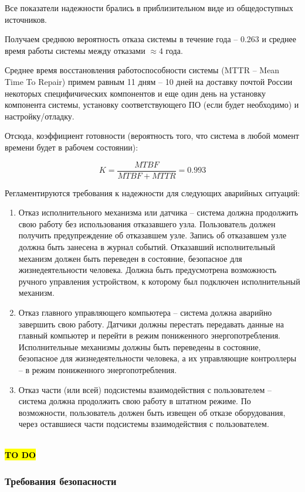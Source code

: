 \documentclass[a4paper, 12pt, titlepage]{article}
\begin{document}
Все показатели надежности брались в приблизительном виде из общедоступных источников.

Получаем среднюю вероятность отказа системы в течение года -- 0.263 и среднее время работы системы между 
отказами $\approx 4$ года.

Среднее время восстановления работоспособности системы (MTTR -- Mean Time To Repair) примем равным 11 дням -- 10 дней 
на доставку почтой России некоторых специфичических компонентов и еще один день на установку компонента системы, установку 
соответствующего ПО (если будет необходимо) и настройку/отладку.

Отсюда, коэффициент готовности (вероятность того, что система в любой момент времени будет в рабочем состоянии):

$$K = \frac{MTBF}{MTBF + MTTR} = 0.993$$

Регламентируются требования к надежности для следующих аварийных ситуаций:
\begin{enumerate}
\item Отказ исполнительного механизма или датчика -- система должна продолжить свою работу без использования 
отказавшего узла. Пользователь должен получить предупреждение об отказавшем узле. Запись об отказавшем узле 
должна быть занесена в журнал событий. Отказавший исполнительный механизм должен быть переведен в состояние, 
безопасное для жизнедеятельности человека. Должна быть предусмотрена возможность ручного управления устройством, 
к которому был подключен исполнительный механизм.
\item Отказ главного управляющего компьютера -- система должна аварийно завершить свою работу. Датчики должны перестать 
передавать данные на главный компьютер и перейти в режим пониженного энергопотребления. Исполнительные механизмы должны 
быть переведены в состояние, безопасное для жизнедеятельности человека, а их управляющие контроллеры -- в режим пониженного 
энергопотребления.
\item Отказ части (или всей) подсистемы взаимодействия с пользователем -- система должна продолжить свою работу в штатном 
режиме. По возможности, пользователь должен быть извещен об отказе оборудования, через оставшиеся части подсистемы взаимодействия 
с пользователем.
\end{enumerate}
\\
\hl{\bf TO DO}
\subsubsection{Требования безопасности}
\end{document}
